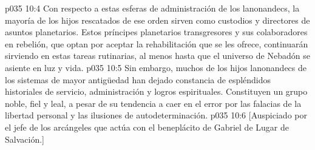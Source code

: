 \vs p035 10:4 \pc Con respecto a estas esferas de administración de los lanonandecs, la mayoría de los hijos rescatados de ese orden sirven como custodios y directores de asuntos planetarios. Estos príncipes planetarios transgresores y sus colaboradores en rebelión, que optan por aceptar la rehabilitación que se les ofrece, continuarán sirviendo en estas tareas rutinarias, al menos hasta que el universo de Nebadón se asiente en luz y vida.
\vs p035 10:5 \pc Sin embargo, muchos de los hijos lanonandecs de los sistemas de mayor antigüedad han dejado constancia de espléndidos historiales de servicio, administración y logros espirituales. Constituyen un grupo noble, fiel y leal, a pesar de su tendencia a caer en el error por las falacias de la libertad personal y las ilusiones de autodeterminación.
\vsetoff
\vs p035 10:6 [Auspiciado por el jefe de los arcángeles que actúa con el beneplácito de Gabriel de Lugar de Salvación.]
